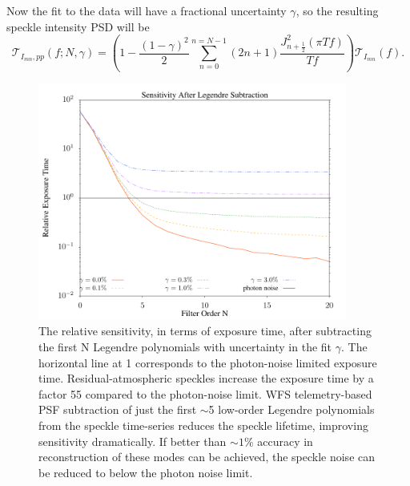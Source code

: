\documentclass[10pt,preprint]{aastex631}
\begin{document}

Now the fit to the data will have a fractional uncertainty $\gamma$, so the resulting speckle intensity PSD will be
\begin{equation}
\mathcal{T}_{I_{mn},pp}(f;N,\gamma) = \left( 1 -  \frac{(1-\gamma)^2}{2}\sum_{n=0}^{n=N-1}  (2n+1) \frac{J_{n+\frac{1}{2}}^2(\pi T f)}{T f}\right) \mathcal{T}_{I_{mn}}(f).
\end{equation}

\begin{figure}
\centering
\includegraphics[width=4in]{relsens.pdf}
\caption{The relative sensitivity, in terms of exposure time, after subtracting the first N Legendre polynomials with uncertainty in the fit $\gamma$.  The horizontal line at 1 corresponds to the photon-noise limited exposure time.  Residual-atmospheric speckles increase the exposure time by a factor 55 compared to the photon-noise limit.   
WFS telemetry-based PSF subtraction of just the first $\sim$5 low-order Legendre polynomials from the speckle time-series reduces the speckle lifetime, improving sensitivity dramatically. If better than $\sim$$1\%$ accuracy in reconstruction of these modes can be achieved, the speckle noise can be reduced to below the photon noise limit. \label{fig:legrelsens}}
\end{figure}
\end{document}
